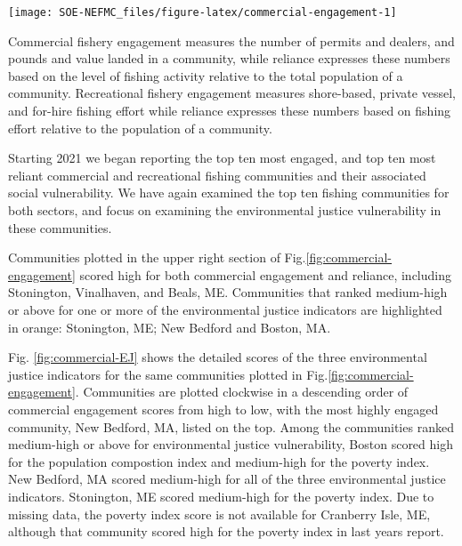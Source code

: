 \documentclass[
  10pt,
]{article}
\let\origfigure\figure
\let\endorigfigure\endfigure
\renewenvironment{figure}[1][2] {
    \expandafter\origfigure\expandafter[H]
} {
    \endorigfigure
}
\begin{document}
\begin{figure}

{\centering \texttt{[image: SOE-NEFMC\_files/figure-latex/commercial-engagement-1]} 

}

\caption{Commercial engagement, reliance, and environmental justice vulnerability for the top commercially engaged and reliant fishing communities in New England.  Communities ranked medium-high or above for one or more of the environmental justice indicators are highlighted in orange. *Community scored high (1.00 and above) for both commercial engagement and reliance indicators.}\label{fig:commercial-engagement}
\end{figure}

Commercial fishery engagement measures the number of permits and dealers, and pounds and value landed in a community, while reliance expresses these numbers based on the level of fishing activity relative to the total population of a community. Recreational fishery engagement measures shore-based, private vessel, and for-hire fishing effort while reliance expresses these numbers based on fishing effort relative to the population of a community.

Starting 2021 we began reporting the top ten most engaged, and top ten most reliant commercial and recreational fishing communities and their associated social vulnerability. We have again examined the top ten fishing communities for both sectors, and focus on examining the environmental justice vulnerability in these communities.

Communities plotted in the upper right section of Fig.\ref{fig:commercial-engagement} scored high for both commercial engagement and reliance, including Stonington, Vinalhaven, and Beals, ME. Communities that ranked medium-high or above for one or more of the environmental justice indicators are highlighted in orange: Stonington, ME; New Bedford and Boston, MA.

Fig. \ref{fig:commercial-EJ} shows the detailed scores of the three environmental justice indicators for the same communities plotted in Fig.\ref{fig:commercial-engagement}. Communities are plotted clockwise in a descending order of commercial engagement scores from high to low, with the most highly engaged community, New Bedford, MA, listed on the top. Among the communities ranked medium-high or above for environmental justice vulnerability, Boston scored high for the population compostion index and medium-high for the poverty index. New Bedford, MA scored medium-high for all of the three environmental justice indicators. Stonington, ME scored medium-high for the poverty index. Due to missing data, the poverty index score is not available for Cranberry Isle, ME, although that community scored high for the poverty index in last years report.
\end{document}
